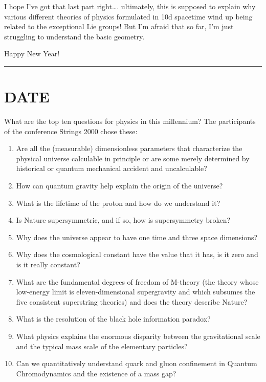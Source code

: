 \documentclass{article}
\def\tightlist{}
\begin{document}
I hope I've got that last part right\ldots. ultimately, this is supposed
to explain why various different theories of physics formulated in 10d
spacetime wind up being related to the exceptional Lie groups! But I'm
afraid that so far, I'm just struggling to understand the basic
geometry.

Happy New Year!

\begin{center}\rule{0.5\linewidth}{0.5pt}\end{center}
\hypertarget{week164}{%
\section{DATE}\label{week164}}

What are the top ten questions for physics in this millennium? The
participants of the conference Strings 2000 chose these:

\begin{enumerate}
\def\labelenumi{\arabic{enumi}.}
\tightlist
\item
  Are all the (measurable) dimensionless parameters that characterize
  the physical universe calculable in principle or are some merely
  determined by historical or quantum mechanical accident and
  uncalculable?
\item
  How can quantum gravity help explain the origin of the universe?
\item
  What is the lifetime of the proton and how do we understand it?
\item
  Is Nature supersymmetric, and if so, how is supersymmetry broken?
\item
  Why does the universe appear to have one time and three space
  dimensions?
\item
  Why does the cosmological constant have the value that it has, is it
  zero and is it really constant?
\item
  What are the fundamental degrees of freedom of M-theory (the theory
  whose low-energy limit is eleven-dimensional supergravity and which
  subsumes the five consistent superstring theories) and does the theory
  describe Nature?
\item
  What is the resolution of the black hole information paradox?
\item
  What physics explains the enormous disparity between the gravitational
  scale and the typical mass scale of the elementary particles?
\item
  Can we quantitatively understand quark and gluon confinement in
  Quantum Chromodynamics and the existence of a mass gap?
\end{enumerate}
\end{document}

